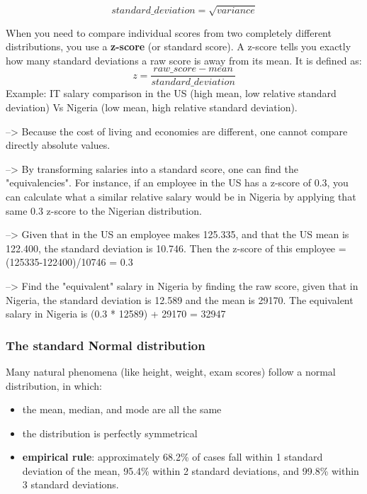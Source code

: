 \begin{equation}
    standard\_deviation = \sqrt{variance}
\end{equation}

When you need to compare individual scores from two completely different distributions, you use a \textbf{z-score} (or standard score). A z-score tells you exactly how many standard deviations a raw score is away from its mean. It is defined as:
\begin{equation}
    z = \frac{raw\_score - mean}{standard\_deviation}
\end{equation}
Example: IT salary comparison in the US (high mean, low relative standard deviation) Vs Nigeria (low mean, high relative standard deviation). \par
--> Because the cost of living and economies are different, one cannot compare directly absolute values.\par
--> By transforming salaries into a standard score, one can find the "equivalencies". For instance, if an employee in the US has a z-score of 0.3, you can calculate what a similar relative salary would be in Nigeria by applying that same 0.3 z-score to the Nigerian distribution.\par
--> Given that in the US an employee makes 125.335, and that the US mean is 122.400, the standard deviation is 10.746. Then the z-score of this employee = (125335-122400)/10746 = 0.3 \par
--> Find the "equivalent" salary in Nigeria by finding the raw score, given that in Nigeria, the standard deviation is 12.589 and the mean is 29170. The equivalent salary in Nigeria is (0.3 * 12589) + 29170 = 32947

\subsubsection{The standard Normal distribution}
Many natural phenomena (like height, weight, exam scores) follow a normal distribution, in which:
\begin{itemize}[noitemsep]
    \item the mean, median, and mode are all the same
    \item the distribution is perfectly symmetrical
    \item \textbf{empirical rule}: approximately 68.2\% of cases fall within 1 standard deviation of the mean, 95.4\% within 2 standard deviations, and 99.8\% within 3 standard deviations.
\end{itemize}

